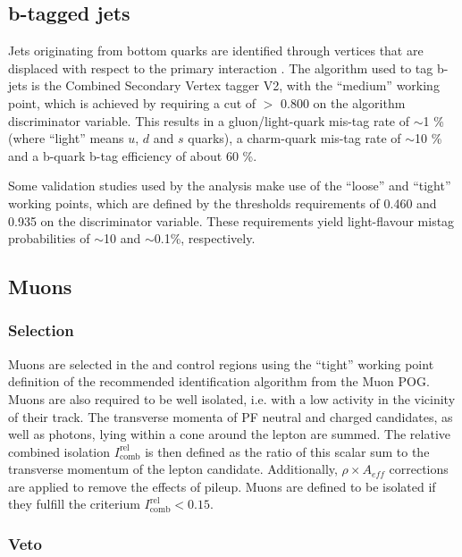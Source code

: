 \subsection{b-tagged jets}
\label{sec:btags}

Jets originating from bottom quarks are identified through vertices
that are displaced with respect to the primary interaction
\cite{Chatrchyan:2012jua}.  The algorithm used to tag b-jets is the
Combined Secondary Vertex tagger V2, with the ``medium'' working
point, which is achieved by requiring a cut of $>$ 0.800 on the
algorithm discriminator variable.  This results in a gluon/light-quark
mis-tag rate of $\sim$1 \% (where ``light'' means $u$, $d$ and $s$
quarks), a charm-quark mis-tag rate of $\sim$10 \% and a b-quark b-tag
efficiency of about 60 \%.

Some validation studies used by the analysis make use of the ``loose''
and ``tight'' working points, which are defined by the thresholds
requirements of 0.460 and 0.935 on the discriminator variable. These
requirements yield light-flavour mistag probabilities of $\sim$10 and
$\sim$0.1\%, respectively.

\subsection{Muons}
\label{sec:muon-id}

\subsubsection{Selection}

Muons are selected in the \mj and \mmj control regions using the
``tight'' working point definition of the recommended identification
algorithm from the Muon POG.  Muons are also required to be well
isolated, i.e. with a low activity in the vicinity of their track.
The transverse momenta of PF neutral and charged candidates, as well
as photons, lying within a cone around the lepton are summed.  The
relative combined isolation $I^\mathrm{rel}_\mathrm{comb}$ is then defined as the
ratio of this scalar sum to the transverse momentum of the lepton
candidate. Additionally, $\rho\times A_{eff}$ corrections are applied
to remove the effects of pileup.  Muons are defined to be isolated if
they fulfill the criterium $I^\mathrm{rel}_\mathrm{comb} < 0.15$.

\subsubsection{Veto}

